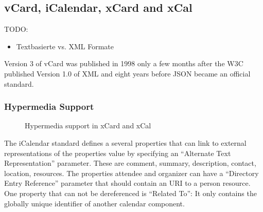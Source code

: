 \documentclass[12pt,a4paper]{scrartcl}		%
\begin{document}
\subsection{vCard, iCalendar, xCard and xCal}

TODO:
\begin{itemize}
\item Textbasierte vs. XML Formate
\end{itemize}

Version 3 of vCard was published in 1998\cite{RFC2425} only a few months after
the W3C published Version 1.0 of XML\cite{Paoli:98:XR} and eight years before
JSON became an official standard.\cite{RFC4627}

\subsubsection{Hypermedia Support}

\begin{figure}[tb]

  \caption{Hypermedia support in xCard and xCal}
\end{figure}

The iCalendar standard defines a several properties that can link to external
representations of the properties value by specifying an ``Alternate Text
Representation'' parameter. These are comment, summary, description, contact,
location, resources. The properties attendee and organizer can have a
``Directory Entry Reference'' parameter that should contain an URI to a person
resource. One property that can not be dereferenced is ``Related To'': It only
contains the globally unique identifier of another calendar component.
\end{document}
